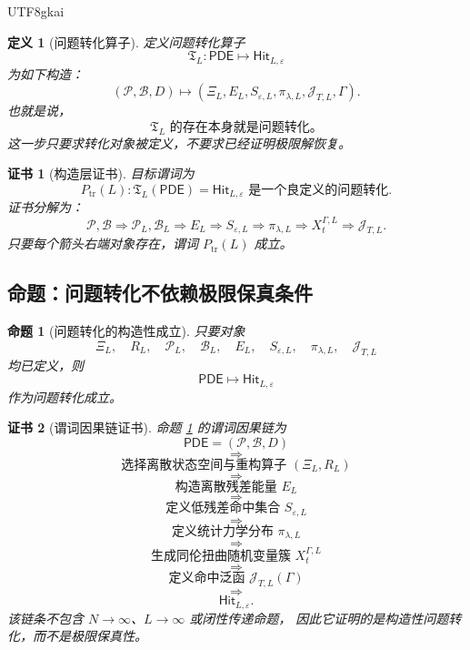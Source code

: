 \documentclass[12pt]{article}
\newtheorem{definition}{定义}[section]
\newtheorem{proposition}{命题}[section]
\newtheorem{Certificate}{证书}[section]
\begin{document}
\begin{CJK*}{UTF8}{gkai}
\begin{definition}[问题转化算子]
\label{def:tex55-transform-operator}
定义问题转化算子
\[
  \mathfrak T_L:
  \mathsf{PDE}
  \longmapsto
  \mathsf{Hit}_{L,\varepsilon}
\]
为如下构造：
\[
  (\mathcal P,\mathcal B,D)
  \longmapsto
  (\Xi_L,E_L,S_{\varepsilon,L},\pi_{\lambda,L},\mathcal J_{T,L},\Gamma).
\]
也就是说，
\[
  \boxed{
  \mathfrak T_L
  \text{ 的存在本身就是问题转化。}
  }
\]
这一步只要求转化对象被定义，不要求已经证明极限解恢复。
\end{definition}

\begin{Certificate}[构造层证书]
\label{cert:tex55-transform-constructive-certificate}
目标谓词为
\[
  P_{\mathrm{tr}}(L):
  \mathfrak T_L(\mathsf{PDE})=\mathsf{Hit}_{L,\varepsilon}
  \text{ 是一个良定义的问题转化}.
\]
证书分解为：
\[
  \mathcal P,\mathcal B
  \Rightarrow
  \mathcal P_L,\mathcal B_L
  \Rightarrow
  E_L
  \Rightarrow
  S_{\varepsilon,L}
  \Rightarrow
  \pi_{\lambda,L}
  \Rightarrow
  X_t^{\Gamma,L}
  \Rightarrow
  \mathcal J_{T,L}.
\]
只要每个箭头右端对象存在，谓词 \(P_{\mathrm{tr}}(L)\) 成立。
\end{Certificate}

\subsection{命题：问题转化不依赖极限保真条件}
\label{subsec:tex55-transformation-independent}

\begin{proposition}[问题转化的构造性成立]
\label{prop:tex55-transformation-independent-of-fidelity}
只要对象
\[
  \Xi_L,\quad
  R_L,\quad
  \mathcal P_L,\quad
  \mathcal B_L,\quad
  E_L,\quad
  S_{\varepsilon,L},\quad
  \pi_{\lambda,L},\quad
  \mathcal J_{T,L}
\]
均已定义，则
\[
  \mathsf{PDE}
  \longmapsto
  \mathsf{Hit}_{L,\varepsilon}
\]
作为问题转化成立。
\end{proposition}

\begin{Certificate}[谓词因果链证书]
\label{cert:tex55-transformation-independent-of-fidelity}
命题 \ref{prop:tex55-transformation-independent-of-fidelity} 的谓词因果链为
\[
  \mathsf{PDE}=(\mathcal P,\mathcal B,D)
\]
\[
  \Longrightarrow
\]
\[
  \text{选择离散状态空间与重构算子 }(\Xi_L,R_L)
\]
\[
  \Longrightarrow
\]
\[
  \text{构造离散残差能量 }E_L
\]
\[
  \Longrightarrow
\]
\[
  \text{定义低残差命中集合 }S_{\varepsilon,L}
\]
\[
  \Longrightarrow
\]
\[
  \text{定义统计力学分布 }\pi_{\lambda,L}
\]
\[
  \Longrightarrow
\]
\[
  \text{生成同伦扭曲随机变量簇 }X_t^{\Gamma,L}
\]
\[
  \Longrightarrow
\]
\[
  \text{定义命中泛函 }\mathcal J_{T,L}(\Gamma)
\]
\[
  \Longrightarrow
\]
\[
  \mathsf{Hit}_{L,\varepsilon}.
\]
该链条不包含 \(N\to\infty\)、\(L\to\infty\) 或闭性传递命题，
因此它证明的是构造性问题转化，而不是极限保真性。
\end{Certificate}


\end{CJK*}
\end{document}
